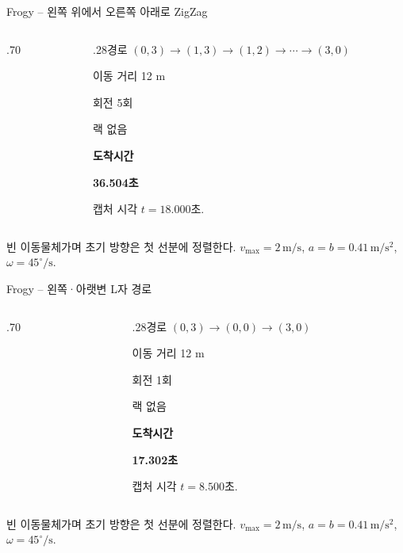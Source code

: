 \begin{frame}{Frogy -- 왼쪽 위에서 오른쪽 아래로 ZigZag}
\begin{columns}[T,onlytextwidth]
\begin{column}{.70\textwidth}\end{column}
\begin{column}{.28\textwidth}\small 경로 $(0,3)\to(1,3)\to(1,2)\to\cdots\to(3,0)$\par\medskip 이동 거리 12 m\par 회전 5회\par 랙 없음\par\medskip\textbf{도착시간}\par\textbf{36.504초}\par\medskip 캡처 시각 $t=18.000$초.\end{column}
\end{columns}
\vspace{1mm}
{\tiny\texttt{}\par \texttt{}\par 빈 이동물체가며 초기 방향은 첫 선분에 정렬한다. $v_{\max}=2\,\mathrm{m/s}$, $a=b=0.41\,\mathrm{m/s^2}$, $\omega=45^\circ/\mathrm{s}$.}
\end{frame}

\begin{frame}{Frogy -- 왼쪽·아랫변 L자 경로}
\begin{columns}[T,onlytextwidth]
\begin{column}{.70\textwidth}\end{column}
\begin{column}{.28\textwidth}\small 경로 $(0,3)\to(0,0)\to(3,0)$\par\medskip 이동 거리 12 m\par 회전 1회\par 랙 없음\par\medskip\textbf{도착시간}\par\textbf{17.302초}\par\medskip 캡처 시각 $t=8.500$초.\end{column}
\end{columns}
\vspace{1mm}
{\tiny\texttt{}\par \texttt{}\par 빈 이동물체가며 초기 방향은 첫 선분에 정렬한다. $v_{\max}=2\,\mathrm{m/s}$, $a=b=0.41\,\mathrm{m/s^2}$, $\omega=45^\circ/\mathrm{s}$.}
\end{frame}

